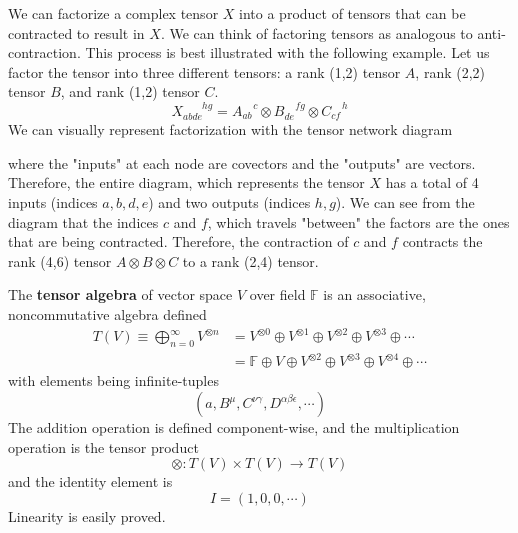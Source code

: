   \begin{definition}
    We can factorize a complex tensor $X$ into a product of tensors that can be contracted to result in $X$. We can think of factoring tensors as analogous to anti-contraction. This process is best illustrated with the following example. Let us factor the tensor into three different tensors: a rank (1,2) tensor $A$, rank (2,2) tensor $B$, and rank (1,2) tensor $C$. 
    \[X_{abde}^{\;\;\;\;\;\;\;hg} = A_{ab}^{\;\;\;\;c} \otimes B_{de}^{\;\;\;\;fg} \otimes C_{cf}^{\;\;\;\;h}\]
    We can visually represent factorization with the tensor network diagram
    \begin{center}
    \end{center}
    where the "inputs" at each node are covectors and the "outputs" are vectors. Therefore, the entire diagram, which represents the tensor $X$ has a total of 4 inputs (indices $a, b, d, e$) and two outputs (indices $h, g$). We can see from the diagram that the indices $c$ and $f$, which travels "between" the factors are the ones that are being contracted. Therefore, the contraction of $c$ and $f$ contracts the rank (4,6) tensor $A \otimes B \otimes C$ to a rank (2,4) tensor. 
  \end{definition}

  \begin{definition}
    The \textbf{tensor algebra} of vector space $V$ over field $\mathbb{F}$ is an associative, noncommutative algebra defined
    \begin{align*}
      T(V) \equiv \bigoplus_{n = 0}^{\infty} V^{\otimes n} & = V^{\otimes 0} \oplus V^{\otimes 1} \oplus V^{\otimes 2} \oplus V^{\otimes 3} \oplus \cdots \\
      & = \mathbb{F} \oplus V \oplus V^{\otimes 2} \oplus V^{\otimes 3} \oplus V^{\otimes 4} \oplus\cdots 
    \end{align*}
    with elements being infinite-tuples
    \[ (a, B^\mu, C^{\nu \gamma}, D^{\alpha \beta \epsilon}, \cdots)\]
    The addition operation is defined component-wise, and the multiplication operation is the tensor product 
    \[\otimes: T(V) \times T(V) \longrightarrow T(V)\]
    and the identity element is
    \[I = (1, 0, 0, \cdots) \]
    Linearity is easily proved. 
  \end{definition}

